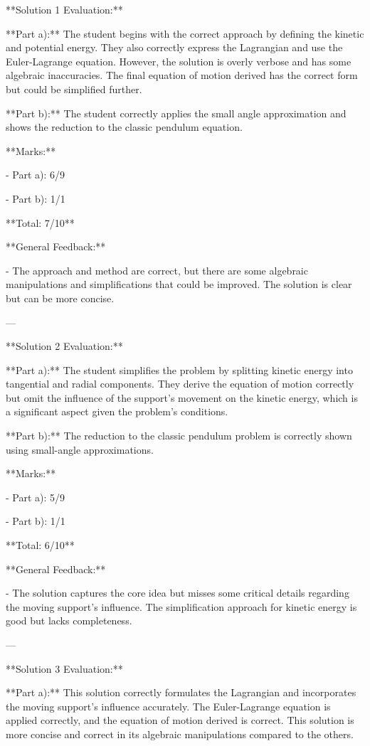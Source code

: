 \documentclass[a4paper,11pt]{article}
\begin{document}
**Solution 1 Evaluation:**

**Part a):** The student begins with the correct approach by defining the kinetic and potential energy. They also correctly express the Lagrangian and use the Euler-Lagrange equation. However, the solution is overly verbose and has some algebraic inaccuracies. The final equation of motion derived has the correct form but could be simplified further. 

**Part b):** The student correctly applies the small angle approximation and shows the reduction to the classic pendulum equation.

**Marks:**

- Part a): 6/9

- Part b): 1/1

**Total: 7/10**

**General Feedback:**

- The approach and method are correct, but there are some algebraic manipulations and simplifications that could be improved. The solution is clear but can be more concise.

---

**Solution 2 Evaluation:**

**Part a):** The student simplifies the problem by splitting kinetic energy into tangential and radial components. They derive the equation of motion correctly but omit the influence of the support's movement on the kinetic energy, which is a significant aspect given the problem's conditions.

**Part b):** The reduction to the classic pendulum problem is correctly shown using small-angle approximations.

**Marks:**

- Part a): 5/9

- Part b): 1/1

**Total: 6/10**

**General Feedback:**

- The solution captures the core idea but misses some critical details regarding the moving support's influence. The simplification approach for kinetic energy is good but lacks completeness.

---

**Solution 3 Evaluation:**

**Part a):** This solution correctly formulates the Lagrangian and incorporates the moving support's influence accurately. The Euler-Lagrange equation is applied correctly, and the equation of motion derived is correct. This solution is more concise and correct in its algebraic manipulations compared to the others.
\end{document}
